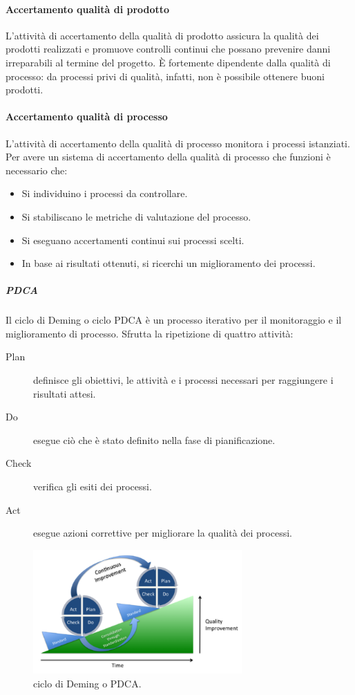 \documentclass[../norme-di-progetto.tex]{subfiles}
\begin{document}
\paragraph{Accertamento qualità di prodotto}%
\label{par:accertamento_qualita_di_prodotto}
L'attività di accertamento della qualità di prodotto assicura la qualità dei prodotti realizzati e promuove controlli continui che possano prevenire danni irreparabili al termine del progetto. È fortemente dipendente dalla qualità di processo: da processi privi di qualità, infatti, non è possibile ottenere buoni prodotti.

\paragraph{Accertamento qualità di processo}%
\label{par:accertamento_qualita_di_processo}
L'attività di accertamento della qualità di processo monitora i processi istanziati. Per avere un sistema di accertamento della qualità di processo che funzioni è necessario che:

\begin{itemize}
  \item Si individuino i processi da controllare.
  \item Si stabiliscano le metriche di valutazione del processo.
  \item Si eseguano accertamenti continui sui processi scelti.
  \item In base ai risultati ottenuti, si ricerchi un miglioramento dei processi.
\end{itemize}

\subparagraph{PDCA}%
\label{subp:PDCA}
Il ciclo di Deming o ciclo PDCA è un processo iterativo per il monitoraggio e il miglioramento di processo. Sfrutta la ripetizione di quattro attività:

\begin{description}
  \item [Plan] definisce gli obiettivi, le attività e i processi necessari per raggiungere i risultati attesi.
  \item [Do] esegue ciò che è stato definito nella fase di pianificazione.
  \item [Check] verifica gli esiti dei processi.
  \item [Act] esegue azioni correttive per migliorare la qualità dei processi.
\end{description}
\begin{figure}[H]
  \includegraphics[width=8cm]{PDCA-process.png}
  \centering
  \caption{ciclo di Deming o PDCA.}
\end{figure}
\end{document}
